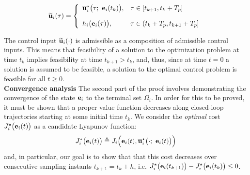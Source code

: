 \begin{equation}
  \widetilde{\bm{\mathbf{u}}}_i(\tau) = \left\{
      \begin{array}{ll}
        \overline{\bm{\mathbf{u}}}_i^{\star}\big(\tau;\ \bm{\mathbf{e}}_i(t_k)\big), & \tau \in [t_{k+1}, t_k + T_p] \\[2.5ex]
        h_i\big(\bm{\mathbf{e}}_i(\tau)\big), & \tau \in (t_k + T_p, t_{k+1} + T_p]
      \end{array}
      \right.
\label{eq:optimal_input_t_plus_one}
\end{equation}

The control input $\widetilde{\bm{\mathbf{u}}}_i(\cdot)$ is admissible as a
composition of admissible control inputs. This means that feasibility of a
solution to the optimization problem at time $t_k$ implies feasibility at
time $t_{k+1} > t_k$, and, thus, since at time $t=0$ a solution is assumed to
be feasible, a solution to the optimal control problem is feasible for all
$t \geq 0$.\\[2.5ex]

\textbf{Convergence analysis}
The second part of the proof involves demonstrating the convergence of the
state $\bm{\mathbf{e}}_i$ to the terminal set $\Omega_i$. In order for this
to be proved, it must be shown that a proper value function decreases along
closed-loop trajectories starting at some initial time $t_k$. We consider the
\textit{optimal} cost $J_i^{\star}\big(\bm{\mathbf{e}}_i(t)\big)$ as a candidate
Lyapunov function:
$$J_i^{\star}\big(\vect{e}_i(t)\big) \triangleq J_i \Big(\vect{e}_i(t), \overline{\vect{u}}_i^{\star}\big(\cdot;\ \vect{e}_i(t)\big)\Big)$$
and, in particular, our goal is to show that that this cost decreases over
consecutive sampling instants $t_{k+1} = t_k + h$, i.e.
$J_i^{\star}\big(\bm{\mathbf{e}}_i(t_{k+1})\big) - J_i^{\star}\big(\bm{\mathbf{e}}_i(t_k)\big) \leq 0$.\\[2.5ex]

